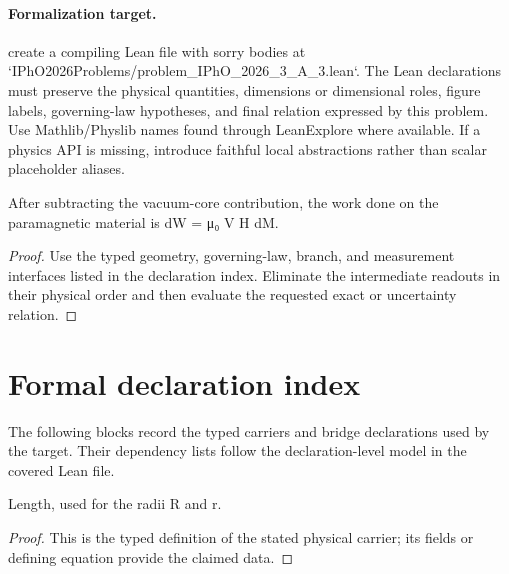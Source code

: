 \paragraph{Formalization target.}
create a compiling Lean file with sorry bodies at `IPhO2026Problems/problem\_IPhO\_2026\_3\_A\_3.lean`. The Lean declarations must preserve the physical quantities, dimensions or dimensional roles, figure labels, governing-law hypotheses, and final relation expressed by this problem.
Use Mathlib/Physlib names found through LeanExplore where available. If a physics API is missing, introduce faithful local abstractions rather than scalar placeholder aliases.

\begin{theorem}
  \label{thm:physics:IPhO_2026_3_A_3:target}
  After subtracting the vacuum-core contribution, the work done on the paramagnetic material is dW = μ₀ V H dM.
\end{theorem}
\begin{proof}
  Use the typed geometry, governing-law, branch, and measurement interfaces listed in the declaration index.  Eliminate the intermediate readouts in their physical order and then evaluate the requested exact or uncertainty relation.
\end{proof}
\section*{Formal declaration index}
The following blocks record the typed carriers and bridge declarations used by the target.  Their dependency lists follow the declaration-level model in the covered Lean file.

\begin{definition}
  \label{def:physics:IPhO_2026_3_A_3:aux001}
  Length, used for the radii R and r.
\end{definition}
\begin{proof}
  This is the typed definition of the stated physical carrier; its fields or defining equation provide the claimed data.
\end{proof}

